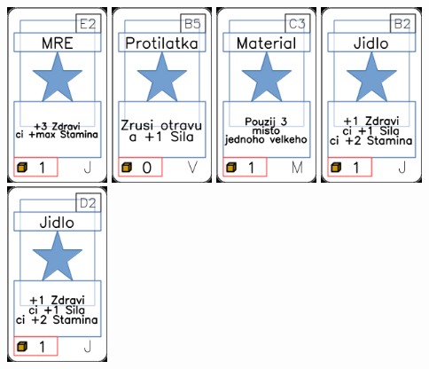 \documentclass[a4paper]{article}
\begin{document}
	\includegraphics[width=3.0cm]{img-1_21}
	\includegraphics[width=3.0cm]{img-1_69}
	\includegraphics[width=3.0cm]{img-1_42}
	\includegraphics[width=3.0cm]{img-1_6}
	\includegraphics[width=3.0cm]{img-1_16}
\end{document}

